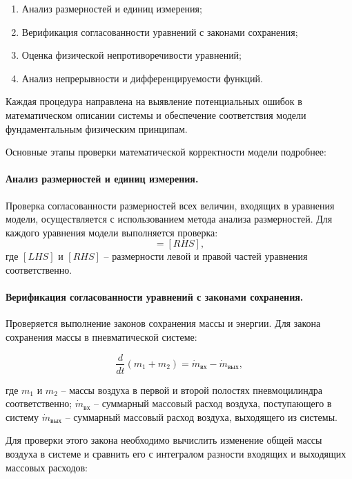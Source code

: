 \begin{enumerate}
    \item Анализ размерностей и единиц измерения;
    \item Верификация согласованности уравнений с законами сохранения;
    \item Оценка физической непротиворечивости уравнений;
    \item Анализ непрерывности и дифференцируемости функций.
\end{enumerate}

Каждая процедура направлена на выявление потенциальных ошибок в математическом описании
системы и обеспечение соответствия модели фундаментальным физическим принципам.

Основные этапы проверки математической корректности модели подробнее:

\paragraph{Анализ размерностей и единиц измерения.}

Проверка согласованности размерностей всех величин, входящих в уравнения модели, осуществляется с использованием метода анализа размерностей. Для каждого уравнения модели выполняется проверка:
\begin{equation}
    [LHS] = [RHS],
\end{equation}
где $[LHS]$ и $[RHS]$ -- размерности левой и правой частей уравнения соответственно.

\paragraph{Верификация согласованности уравнений с законами сохранения.}

Проверяется выполнение законов сохранения массы и энергии. Для закона сохранения массы в пневматической системе:

\begin{equation}
    \frac{d}{dt}(m_1 + m_2) = \dot{m}_\text{вх} - \dot{m}_\text{вых},
\end{equation}

где $m_1$ и $m_2$ -- массы воздуха в первой и второй полостях пневмоцилиндра соответственно;
$\dot{m}_\text{вх}$ -- суммарный массовый расход воздуха, поступающего в систему
$\dot{m}_\text{вых}$ -- суммарный массовый расход воздуха, выходящего из системы.

Для проверки этого закона необходимо вычислить изменение общей массы воздуха в системе и сравнить
его с интегралом разности входящих и выходящих массовых расходов:

